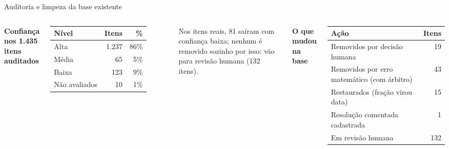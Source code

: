 \documentclass[aspectratio=169,11pt]{beamer}
\begin{document}
\begin{frame}{Auditoria e limpeza da base existente}
  \small
  \begin{columns}[T]
    \textbf{Confiança nos 1.435 itens auditados}\\[3pt]
    \footnotesize
    \begin{tabularx}{\textwidth}{@{}X r r@{}}
      \toprule
      \textbf{Nível} & \textbf{Itens} & \textbf{\%} \\
      \midrule
      Alta    & 1.237 & 86\% \\
      Média   & 65    & 5\% \\
      Baixa   & 123   & 9\% \\
      Não avaliados & 10 & 1\% \\
      \bottomrule
    \end{tabularx}

    \vspace{4pt}
    \scriptsize Nos itens reais, 81 saíram com confiança baixa; nenhum é removido sozinho por isso: vão para revisão humana (132 itens).

    \textbf{O que mudou na base}\\[3pt]
    \footnotesize
    \begin{tabularx}{\textwidth}{@{}X r@{}}
      \toprule
      \textbf{Ação} & \textbf{Itens} \\
      \midrule
      Removidos por decisão humana       & 19 \\
      Removidos por erro matemático (com árbitro) & 43 \\
      Restaurados (fração virou data)    & 15 \\
      Resolução comentada cadastrada     & 1 \\
      Em revisão humana                  & 132 \\
      \bottomrule
    \end{tabularx}
  \end{columns}
\end{frame}
\end{document}
